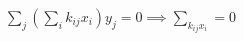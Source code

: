 \documentclass[preview]{standalone}
\begin{document}
\begin{center}
$\sum_j (\sum_i k_{ij} x_i) y_j = 0 \implies \sum_{k_{ij} x_i} = 0$
\end{center}
\end{document}
